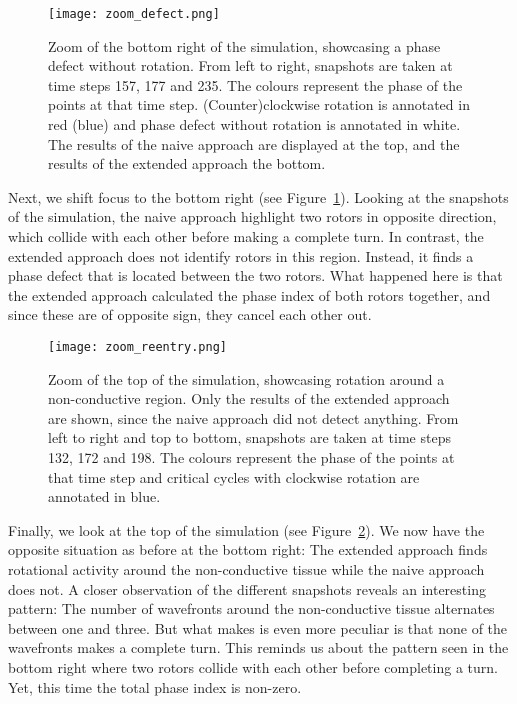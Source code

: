 \documentclass[twocolumn]{article}
\begin{document}
\begin{figure}[ht]
  \centering
  \texttt{[image: zoom\_defect.png]}
  \caption{Zoom of the bottom right of the simulation, showcasing a phase
    defect without rotation. From left to right, snapshots are taken at time
    steps 157, 177 and 235. The colours represent the phase of the points at
    that time step. (Counter)clockwise rotation is annotated in red (blue)
    and phase defect without rotation is annotated in white. The results of
    the naive approach are displayed at the top, and the results of the
  extended approach the bottom.}
  \label{fig:zoom-defect}
\end{figure}

Next, we shift focus to the bottom right (see
Figure~\ref{fig:zoom-defect}). Looking at the snapshots of the simulation,
the naive approach highlight two rotors in opposite direction, which
collide with each other before making a complete turn. In contrast, the
extended approach does not identify rotors in this region. Instead, it
finds a phase defect that is located between the two rotors. What
happened here is that the extended approach calculated the phase index
of both rotors together, and since these are of opposite sign, they
cancel each other out.

\begin{figure}[ht]
  \centering
  \texttt{[image: zoom\_reentry.png]}
  \caption{Zoom of the top of the simulation, showcasing rotation around a
    non-conductive region. Only the results of the extended approach are
    shown, since the naive approach did not detect anything. From left to
    right and top to bottom, snapshots are taken at time steps 132, 172 and
    198. The colours represent the phase of the points at that time step and
  critical cycles with clockwise rotation are annotated in blue.}
  \label{fig:zoom-reentry}
\end{figure}

Finally, we look at the top of the simulation (see
Figure~\ref{fig:zoom-reentry}). We now have the opposite situation as
before at the bottom right: The extended approach finds rotational
activity around the non-conductive tissue while the naive approach does
not. A closer observation of the different snapshots reveals an
interesting pattern: The number of wavefronts around the non-conductive
tissue alternates between one and three. But what makes is even more
peculiar is that none of the wavefronts makes a complete turn. This
reminds us about the pattern seen in the bottom right where two rotors
collide with each other before completing a turn. Yet, this time the
total phase index is non-zero.
\end{document}
